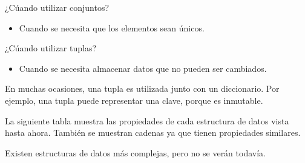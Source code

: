 ¿Cúando utilizar conjuntos?

\begin{itemize}
  \item Cuando se necesita que los elementos sean únicos.
\end{itemize}

¿Cúando utilizar tuplas?

\begin{itemize}
  \item Cuando se necesita almacenar datos que no pueden ser cambiados.
\end{itemize}

En muchas ocasiones, una tupla es utilizada junto con un diccionario.
Por ejemplo, una tupla puede representar una clave, porque es inmutable.

La siguiente tabla muestra las propiedades de cada estructura de datos vista hasta ahora.
También se muestran cadenas ya que tienen propiedades similares.
\medskip\medskip


\medskip\medskip

Existen estructuras de datos más complejas, pero no se verán todavía.

\clearpage